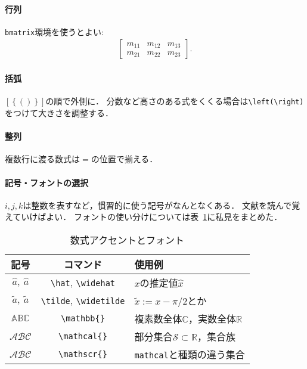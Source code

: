 \documentclass[a4paper,10pt,twocolumn,dvipdfmx]{jsarticle}
\theoremstyle{definition}
\begin{document}
\paragraph{行列} \texttt{bmatrix}環境を使うとよい:
\begin{align}
 \begin{bmatrix}
  m_{11} & m_{12} & m_{13} \\
  m_{21} & m_{22} & m_{23}
 \end{bmatrix}.
\end{align}

\paragraph{括弧} $\left[\left\{\left(\right)\right\}\right]$の順で外側に．
分数など高さのある式をくくる場合は\verb!\left(\right)!をつけて大きさを調整する．

\paragraph{整列} 複数行に渡る数式は$=$の位置で揃える．

\paragraph{記号・フォントの選択}  $i,j,k$は整数を表すなど，慣習的に使う記号がなんとなくある．
文献を読んで覚えていけばよい．
フォントの使い分けについては表~\ref{tab:fonts}に私見をまとめた．

\begin{table}[b]
 \small
 \centering
 \caption{数式アクセントとフォント}
 \begin{tabular}{ccl}
  記号 & コマンド & 使用例\\\hline
  $\hat{a},\ \widehat{a}$ & \verb!\hat!,  \verb!\widehat! & {\footnotesize $x$の推定値$\hat x$}\\
  $\tilde{a},\ \widetilde{a}$ & \verb!\tilde!,  \verb!\widetilde! & {\footnotesize $\tilde x:= x - \pi/2$とか}\\
  $\mathbb{ABC}$ & \verb!\mathbb{}! & {\footnotesize  複素数全体$\mathbb{C}$，実数全体$\mathbb{R}$}\\
  $\mathcal{ABC}$ & \verb!\mathcal{}! & {\footnotesize  部分集合$\mathcal{S}\subset \mathbb{R}$，集合族}\\
  $\mathscr{ABC}$ & \verb!\mathscr{}! & {\footnotesize  \verb!mathcal!と種類の違う集合}
 \end{tabular}
 \label{tab:fonts}
\end{table}
\end{document}

